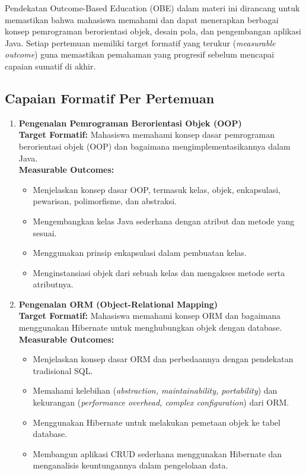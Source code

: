Pendekatan Outcome-Based Education (OBE) dalam materi ini dirancang untuk memastikan bahwa mahasiswa memahami dan dapat menerapkan berbagai konsep pemrograman berorientasi objek, desain pola, dan pengembangan aplikasi Java. Setiap pertemuan memiliki target formatif yang terukur (\textit{measurable outcome}) guna memastikan pemahaman yang progresif sebelum mencapai capaian sumatif di akhir.

\subsection{Capaian Formatif Per Pertemuan}

\begin{enumerate}
	
	\item \textbf{Pengenalan Pemrograman Berorientasi Objek (OOP)}  \\
	\textbf{Target Formatif:} Mahasiswa memahami konsep dasar pemrograman berorientasi objek (OOP) dan bagaimana mengimplementasikannya dalam Java.  \\
	\textbf{Measurable Outcomes:}
	\begin{itemize}
		\item Menjelaskan konsep dasar OOP, termasuk kelas, objek, enkapsulasi, pewarisan, polimorfisme, dan abstraksi.
		\item Mengembangkan kelas Java sederhana dengan atribut dan metode yang sesuai.
		\item Menggunakan prinsip enkapsulasi dalam pembuatan kelas.
		\item Menginstansiasi objek dari sebuah kelas dan mengakses metode serta atributnya.
	\end{itemize}
	
	\item \textbf{Pengenalan ORM (Object-Relational Mapping)}  \\
	\textbf{Target Formatif:} Mahasiswa memahami konsep ORM dan bagaimana menggunakan Hibernate untuk menghubungkan objek dengan database.  \\
	\textbf{Measurable Outcomes:}
	\begin{itemize}
		\item Menjelaskan konsep dasar ORM dan perbedaannya dengan pendekatan tradisional SQL.
		\item Memahami kelebihan (\textit{abstraction, maintainability, portability}) dan kekurangan (\textit{performance overhead, complex configuration}) dari ORM.
		\item Menggunakan Hibernate untuk melakukan pemetaan objek ke tabel database.
		\item Membangun aplikasi CRUD sederhana menggunakan Hibernate dan menganalisis keuntungannya dalam pengelolaan data.
	\end{itemize}
	

\end{enumerate}
